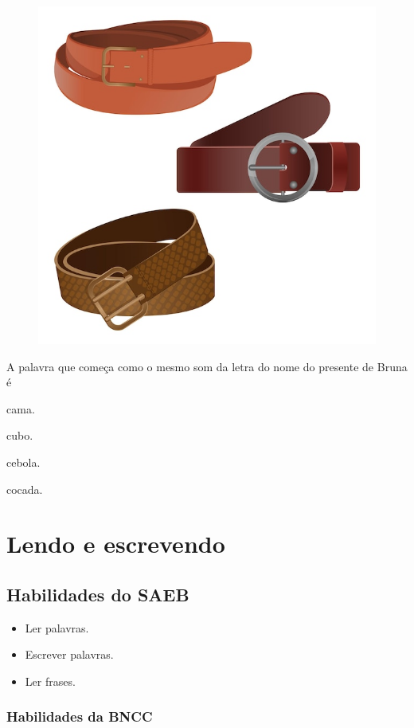\begin{figure}[H]
\centering
\includegraphics[width=.5\textwidth]{media/image48.jpeg}
\end{figure}

A palavra que começa como o mesmo som da letra do nome do presente de Bruna é

\begin{escolha}[itemsep=-3pt]
\item cama.

\item cubo.

\item cebola.

\item cocada.
\end{escolha}

\chapter{Lendo e escrevendo}

\vspace*{-1cm}

\section*{Habilidades do SAEB}

\begin{itemize}
\item Ler palavras.
\item Escrever palavras.
\item Ler frases.
\end{itemize}

\subsection{Habilidades da BNCC}

